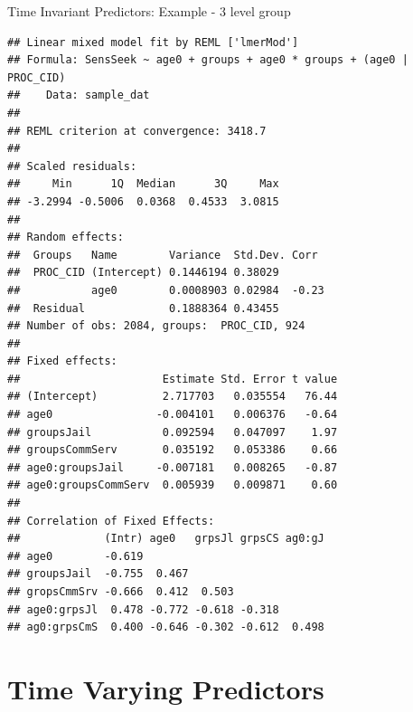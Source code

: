 \begin{frame}[fragile]{Time Invariant Predictors: Example - 3 level
group}

\small

\begin{Shaded}
\begin{Highlighting}[]
\StringTok{ }\OperatorTok{~}\StringTok{ }\OperatorTok{+}\StringTok{ }\OperatorTok{+}\StringTok{ }\OperatorTok{*}\OperatorTok{+}\StringTok{ }
\StringTok{                }\OperatorTok{|}
\end{Highlighting}
\end{Shaded}

\tiny

\begin{verbatim}
## Linear mixed model fit by REML ['lmerMod']
## Formula: SensSeek ~ age0 + groups + age0 * groups + (age0 | PROC_CID)
##    Data: sample_dat
## 
## REML criterion at convergence: 3418.7
## 
## Scaled residuals: 
##     Min      1Q  Median      3Q     Max 
## -3.2994 -0.5006  0.0368  0.4533  3.0815 
## 
## Random effects:
##  Groups   Name        Variance  Std.Dev. Corr 
##  PROC_CID (Intercept) 0.1446194 0.38029       
##           age0        0.0008903 0.02984  -0.23
##  Residual             0.1888364 0.43455       
## Number of obs: 2084, groups:  PROC_CID, 924
## 
## Fixed effects:
##                      Estimate Std. Error t value
## (Intercept)          2.717703   0.035554   76.44
## age0                -0.004101   0.006376   -0.64
## groupsJail           0.092594   0.047097    1.97
## groupsCommServ       0.035192   0.053386    0.66
## age0:groupsJail     -0.007181   0.008265   -0.87
## age0:groupsCommServ  0.005939   0.009871    0.60
## 
## Correlation of Fixed Effects:
##             (Intr) age0   grpsJl grpsCS ag0:gJ
## age0        -0.619                            
## groupsJail  -0.755  0.467                     
## gropsCmmSrv -0.666  0.412  0.503              
## age0:grpsJl  0.478 -0.772 -0.618 -0.318       
## ag0:grpsCmS  0.400 -0.646 -0.302 -0.612  0.498
\end{verbatim}

\normalsize

\end{frame}

\section{Time Varying Predictors}\label{time-varying-predictors}

